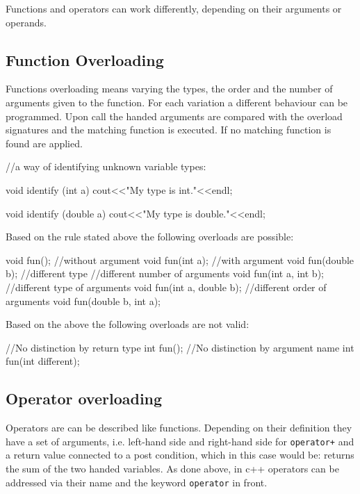 \documentclass[10pt,a4paper]{scrartcl}
\begin{document}
\begin{multicols*}{2}
Functions and operators can work differently, depending on their arguments or operands.

\subsection{Function Overloading}
\label{sec:FunctionOverloading}

Functions overloading means varying the types, the order and the number of arguments given to the function. For each variation a different behaviour can be programmed. Upon call the handed arguments are compared with the overload signatures and the matching function is executed. If no matching function is found  are applied.

\begin{TPCpp}
//a way of identifying unknown variable types:

void identify (int a){
	cout<<"My type is int."<<endl;
}

void identify (double a){
	cout<<"My type is double."<<endl;
}
\end{TPCpp}

Based on the rule stated above the following overloads are possible:

\begin{TPCpp}
void fun();			//without argument
void fun(int a);	//with argument
void fun(double b); //different type
//different number of arguments
void fun(int a, int b);
//different type of arguments
void fun(int a, double b);
//different order of arguments
void fun(double b, int a);
\end{TPCpp}

Based on the above the following overloads are not valid:

\begin{TPCpp}
//No distinction by return type
int fun();
//No distinction by argument name
int fun(int different);
\end{TPCpp}

\subsection{Operator overloading}
\label{sec:OperatorOverloading}

Operators are can be described like functions. Depending on their definition they have a set of arguments, i.e. left-hand side and right-hand side for \verb-operator+- and a return value connected to a post condition, which in this case would be: returns the sum of the two handed variables. As done above, in c++ operators can be addressed via their name and the keyword \verb+operator+ in front.


\end{multicols*}
\end{document}
